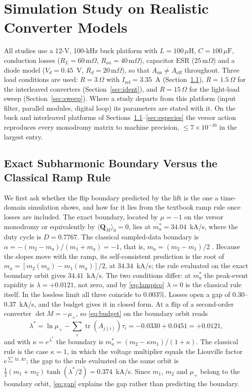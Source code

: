 \documentclass[journal]{IEEEtran}
\begin{document}
\section{Simulation Study on Realistic Converter Models}
\label{sec:validation}
All studies use a 12-V, 100-kHz buck platform with $L=100\,\mu\mathrm{H}$,
$C=100\,\mu\mathrm{F}$, conduction losses ($R_L=60\,\mathrm{m}\Omega$,
$R_{on}=40\,\mathrm{m}\Omega$), capacitor ESR ($25\,\mathrm{m}\Omega$) and a
diode model ($V_d=0.45$~V, $R_d=20\,\mathrm{m}\Omega$), so that
$A_{\mathrm{on}}\neq A_{\mathrm{off}}$ throughout. Three load conditions are
used: $R=3\,\Omega$ with $I_{\mathrm{ref}}=3.35$~A (Section~\ref{sec:ramp}),
$R=1.5\,\Omega$ for the interleaved converters (Section~\ref{sec:ident}), and
$R=15\,\Omega$ for the light-load sweep (Section~\ref{sec:sweep}). Where a
study departs from this platform (input filter, parallel modules, digital
loop) its parameters are stated with it. On the buck and interleaved
platforms of Sections~\ref{sec:ramp}--\ref{sec:especies} the versor action
reproduces every monodromy matrix to machine precision, $\le 7\times10^{-16}$
in the largest entry.

\subsection{Exact Subharmonic Boundary Versus the Classical Ramp Rule}
\label{sec:ramp}
We first ask whether the flip boundary predicted by the lift is the one a
time-domain simulation shows, and how far it lies from the textbook ramp
rule once losses are included. The exact boundary, located by $\mu=-1$ on
the versor monodromy or equivalently by $\langle\bm{Q}_M\rangle_0=0$, lies
at $m_a^{*}=34.04$~kA/s, where the duty cycle is $D=0.7767$. The classical
sampled-data boundary is $\alpha=-(m_2-m_a)/(m_1+m_a)=-1$, that is,
$m_a=(m_2-m_1)/2$ \cite{ridley1991new,erickson2020fundamentals}. Because the
slopes move with the ramp, its self-consistent prediction is the root of
$m_a=[m_2(m_a)-m_1(m_a)]/2$, at $34.34$~kA/s; the rule evaluated on the exact
boundary orbit gives $34.41$~kA/s. The two conditions differ: at $m_a^{*}$
the peak-event rapidity is $\lambda=+0.0121$, not zero, and by
\eqref{eq:lampico} $\lambda=0$ is the classical rule itself. In the lossless
limit all three coincide to $0.003\%$. Losses open a gap of
$0.30$--$0.37$~kA/s, and the budget gives it in closed form. At a flip of a
second-order converter $\det M=-\mu_+$, so \eqref{eq:budget} on the boundary
orbit reads
\begin{equation}
\lambda^{*}=\ln\mu_+-\sum_i\operatorname{tr}(A_{j(i)})\tau_i
=-0.0330+0.0451=+0.0121,
\label{eq:gap}
\end{equation}
and with $\kappa=e^{\lambda^{*}}$ the boundary is
$m_a^{*}=(m_2-\kappa m_1)/(1+\kappa)$. The classical rule is the case
$\kappa=1$, in which the voltage multiplier equals the Liouville factor
$e^{\sum\operatorname{tr}A\tau}$; the gap to the rule evaluated on the same
orbit is $\tfrac12(m_1+m_2)\tanh(\lambda^{*}/2)=0.374$~kA/s. Since $m_1$,
$m_2$ and $\mu_+$ belong to the boundary orbit, \eqref{eq:gap} explains the
gap rather than predicting the boundary.
\end{document}
